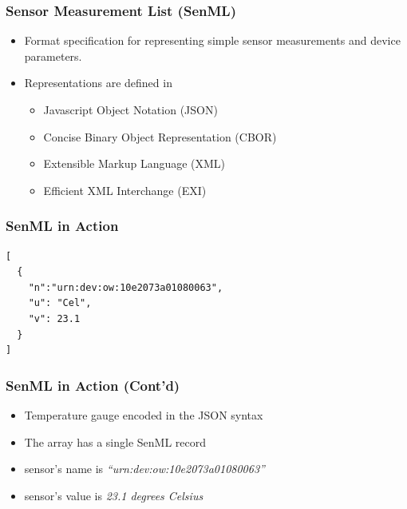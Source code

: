 \documentclass{../iot-lecture}
\begin{document}
\begin{frame}
  \frametitle{Sensor Measurement List (SenML)}
  \begin{itemize}
    \item Format specification for representing simple sensor measurements and device parameters.
    \item Representations are defined in
    \begin{itemize}
      \item Javascript Object Notation (JSON)
      \item Concise Binary Object Representation (CBOR)
      \item Extensible Markup Language (XML)
      \item Efficient XML Interchange (EXI)
    \end{itemize}
  \end{itemize}
\end{frame}

\begin{frame}[fragile]
  \frametitle{SenML in Action}
  \begin{verbatim}
[
  {
    "n":"urn:dev:ow:10e2073a01080063",
    "u": "Cel",
    "v": 23.1
  }
]
  \end{verbatim}
\end{frame}

\begin{frame}
  \frametitle{SenML in Action (Cont'd)}
  \begin{itemize}
    \item Temperature gauge encoded in the JSON syntax
    \item The array has a single SenML record
    \item sensor's name is \textit{``urn:dev:ow:10e2073a01080063''}
    \item sensor's value is \textit{23.1 degrees Celsius}
  \end{itemize}
\end{frame}

\end{document}
